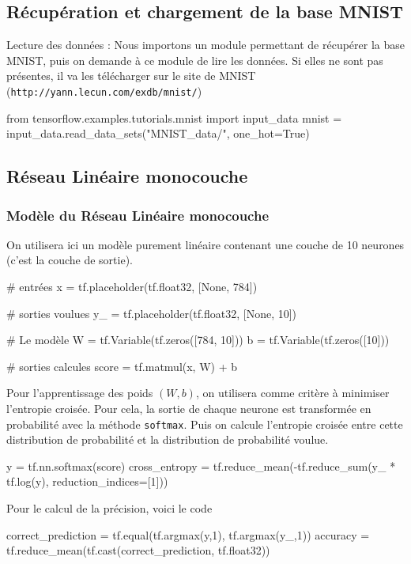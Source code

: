\documentclass[a4paper,11pt]{book}
\begin{document}
\subsection{Récupération et chargement de la base MNIST}
\label{secGetMnist}
Lecture des données : Nous importons un module permettant de récupérer la base MNIST, puis on demande à ce module de lire les données. Si elles ne sont pas présentes, il va les télécharger sur le site de MNIST 
(\verb+http://yann.lecun.com/exdb/mnist/+)

\begin{mypython}
from tensorflow.examples.tutorials.mnist import input_data
mnist = input_data.read_data_sets("MNIST_data/", one_hot=True)
\end{mypython}

\subsection{Réseau Linéaire monocouche}
\subsubsection{Modèle du Réseau Linéaire monocouche}
\label{secMnistMono}

On utilisera ici un modèle purement linéaire contenant une couche de 10 neurones (c'est la couche de sortie).
 
\begin{mypython}
# entrées
x = tf.placeholder(tf.float32, [None, 784])

# sorties voulues
y_ = tf.placeholder(tf.float32, [None, 10])

# Le modèle
W = tf.Variable(tf.zeros([784, 10]))
b = tf.Variable(tf.zeros([10]))

# sorties calcules 
score = tf.matmul(x, W) + b
\end{mypython}

Pour l'apprentissage des poids $(W,b)$, on utilisera comme critère à minimiser l'entropie croisée.
Pour cela, la sortie de chaque neurone est transformée en probabilité avec la méthode \verb+softmax+.
Puis on calcule l'entropie croisée entre cette distribution de probabilité et la distribution de probabilité voulue.
\begin{mypython}
y = tf.nn.softmax(score)
cross_entropy = tf.reduce_mean(-tf.reduce_sum(y_ * tf.log(y), 	reduction_indices=[1]))
\end{mypython}

Pour le calcul de la précision, voici le code
\begin{mypython}
correct_prediction = tf.equal(tf.argmax(y,1), tf.argmax(y_,1))
accuracy = tf.reduce_mean(tf.cast(correct_prediction, tf.float32))
\end{mypython}
\end{document}
